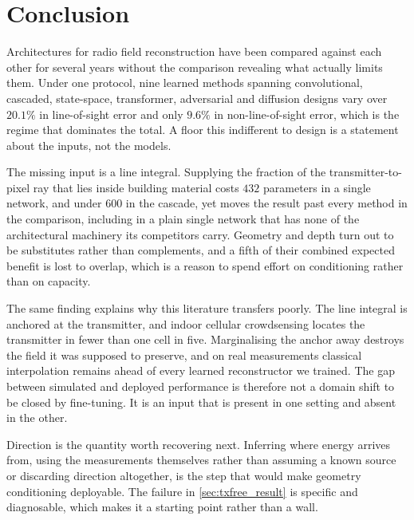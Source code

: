 \section{Conclusion}
\label{sec:conclusion}

Architectures for radio field reconstruction have been compared against each other
for several years without the comparison revealing what actually limits them. Under
one protocol, nine learned methods spanning convolutional, cascaded, state-space,
transformer, adversarial and diffusion designs vary over $20.1\%$ in line-of-sight
error and only $9.6\%$ in non-line-of-sight error, which is the regime that
dominates the total. A floor this indifferent to design is a statement about the
inputs, not the models.

The missing input is a line integral. Supplying the fraction of the
transmitter-to-pixel ray that lies inside building material costs $432$ parameters
in a single network, and under $600$ in the cascade, yet moves the result past
every method in the comparison, including in a plain
single network that has none of the architectural machinery its competitors carry.
Geometry and depth turn out to be substitutes rather than complements, and a fifth
of their combined expected benefit is lost to overlap, which is a reason to spend
effort on conditioning rather than on capacity.

The same finding explains why this literature transfers poorly. The line integral
is anchored at the transmitter, and indoor cellular crowdsensing locates the
transmitter in fewer than one cell in five. Marginalising the anchor away destroys
the field it was supposed to preserve, and on real measurements classical
interpolation remains ahead of every learned reconstructor we trained. The gap
between simulated and deployed performance is therefore not a domain shift to be
closed by fine-tuning. It is an input that is present in one setting and absent in
the other.

Direction is the quantity worth recovering next. Inferring where energy arrives
from, using the measurements themselves rather than assuming a known source or
discarding direction altogether, is the step that would make geometry conditioning
deployable. The failure in \cref{sec:txfree_result} is specific and diagnosable,
which makes it a starting point rather than a wall.
